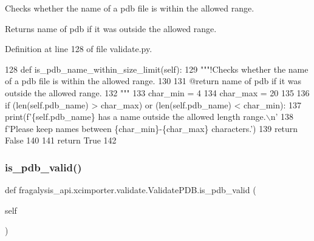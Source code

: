 Checks whether the name of a pdb file is within the allowed range. 

\begin{DoxyReturn}{Returns}
name of pdb if it was outside the allowed range. 
\end{DoxyReturn}


Definition at line 128 of file validate.\+py.


\begin{DoxyCode}
128     \textcolor{keyword}{def }is\_pdb\_name\_within\_size\_limit(self):
129         \textcolor{stringliteral}{"""!Checks whether the name of a pdb file is within the allowed range.}
130 \textcolor{stringliteral}{}
131 \textcolor{stringliteral}{        @return name of pdb if it was outside the allowed range.}
132 \textcolor{stringliteral}{        """}
133         char\_min = 4
134         char\_max = 20
135 
136         \textcolor{keywordflow}{if} (len(self.pdb\_name) > char\_max) \textcolor{keywordflow}{or} (len(self.pdb\_name) < char\_min):
137             print(f\textcolor{stringliteral}{'\{self.pdb\_name\} has a name outside the allowed length range.\(\backslash\)n'}
138                   f\textcolor{stringliteral}{'Please keep names between \{char\_min\}-\{char\_max\} characters.'})
139             \textcolor{keywordflow}{return} \textcolor{keyword}{False}
140 
141         \textcolor{keywordflow}{return} \textcolor{keyword}{True}
142 \end{DoxyCode}
\mbox{\label{classfragalysis__api_1_1xcimporter_1_1validate_1_1_validate_p_d_b_a7e6b2f1b0ea513e4485fabb411c5f3f5}} 
\subsubsection{\texorpdfstring{is\+\_\+pdb\+\_\+valid()}{is\_pdb\_valid()}}
{\footnotesize\ttfamily def fragalysis\+\_\+api.\+xcimporter.\+validate.\+Validate\+P\+D\+B.\+is\+\_\+pdb\+\_\+valid (\begin{DoxyParamCaption}\item[{}]{self }\end{DoxyParamCaption})}



